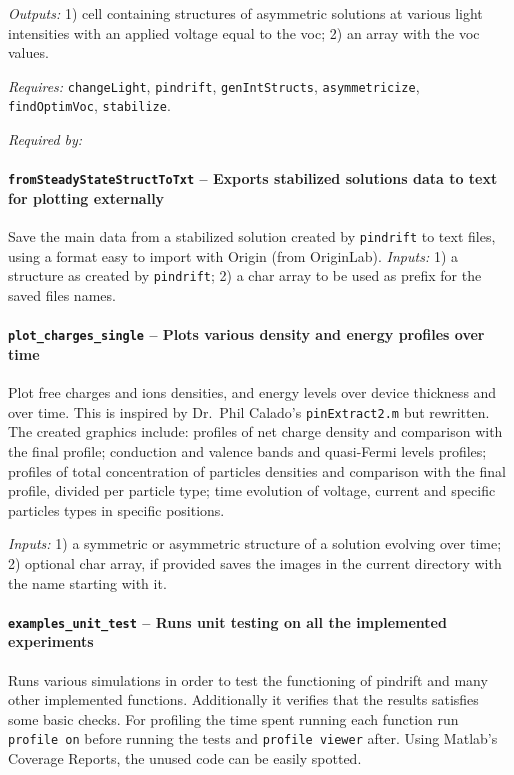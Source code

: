 		\textit{Outputs:} 1) cell containing structures of asymmetric solutions at various light
		     intensities with an applied voltage equal to the \gls{voc};
		2) an array with the \gls{voc} values.
		
		\textit{Requires:} \texttt{change\-Light}, \texttt{pindrift}, \texttt{gen\-Int\-Structs},
		   \texttt{asymmetricize}, \texttt{find\-Optim\-Voc}, \texttt{stabilize}.
		   
		\textit{Required by:} 
		
		\paragraph{\texttt{fromSteadyStateStructToTxt} -- Exports stabilized solutions data to text for plotting externally}
		Save the main data from a stabilized solution created by \texttt{pindrift} to text files, using a format easy to import with Origin (from OriginLab).
				\textit{Inputs:} 1) a structure as created by \texttt{pindrift};
				2) a char array to be used as prefix for the saved files names.

		\paragraph{\texttt{plot\_charges\_single} -- Plots various density and energy profiles over time}
Plot free charges and ions densities, and energy levels over device thickness and over time.
 This is inspired by Dr.\ Phil Calado's \texttt{pinExtract2.m} but rewritten.
 The created graphics include: profiles of net charge density and 
 comparison with the final profile; conduction and valence bands and 
 quasi-Fermi levels profiles; profiles of total concentration of 
 particles densities and comparison with the final profile, divided 
 per particle type; time evolution of voltage, current and specific 
 particles types in specific positions.

		\textit{Inputs:} 1) a symmetric or asymmetric structure of a solution evolving over time;
		2) optional char array, if provided saves the images in the current directory with the name starting with it.

		\paragraph{\texttt{examples\_unit\_test} -- Runs unit testing on all the implemented experiments}
Runs various simulations in order to test the functioning of pindrift and many other implemented functions.
Additionally it verifies that the results satisfies some basic checks.
 For profiling the time spent running each function run \texttt{profile on} before running the tests and \texttt{profile viewer} after.
 Using Matlab's Coverage Reports, the unused code can be easily spotted.

